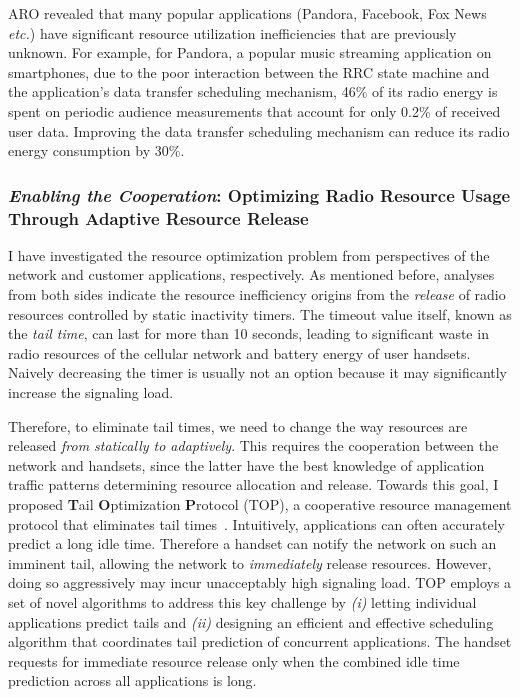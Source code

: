 \documentclass[10pt]{article}
\newcommand{\etc}{\emph{etc.}\xspace}
\begin{document}
\begin{small}
ARO revealed that many popular applications (Pandora, Facebook, Fox News \etc) have significant resource utilization inefficiencies that are previously unknown.
For example, for Pandora, a popular music streaming application on smartphones, due to the poor interaction between the RRC state machine and the application's data transfer scheduling mechanism, 46\% of its radio energy is spent on periodic audience measurements that account for only 0.2\% of received user data. Improving the data transfer scheduling mechanism can reduce its radio energy consumption by 30\%.


\subsubsection*{\emph{Enabling the Cooperation}: Optimizing Radio Resource Usage Through Adaptive Resource Release}

I have investigated the resource optimization problem from perspectives of the network and customer applications, respectively. As mentioned before, analyses from both sides indicate the resource inefficiency origins from the \emph{release} of radio resources controlled by static inactivity timers. The timeout value itself, known as the \emph{tail time}, can last for more than 10 seconds, leading to significant waste in radio resources of the cellular network and battery energy of user handsets. Naively decreasing the timer is usually not an option because it may significantly increase the signaling load.

Therefore, to eliminate tail times, we need to change the way resources are released \emph{from statically to adaptively}. This requires the cooperation between the network and handsets, since the latter have the best knowledge of application traffic patterns determining resource allocation and release. Towards this goal, I proposed \textbf{T}ail \textbf{O}ptimization \textbf{P}rotocol (TOP), a cooperative resource management protocol that eliminates tail times~\cite{qian10_icnp}. Intuitively, applications can often accurately predict a long idle time. Therefore a handset can notify the network on such an imminent tail, allowing the network to \emph{immediately} release resources. However, doing so aggressively may incur unacceptably high signaling load. TOP employs a set of novel algorithms to address this key challenge by \emph{(i)} letting individual applications predict tails and \emph{(ii)} designing an efficient and effective scheduling algorithm that coordinates tail prediction of concurrent applications. The handset requests for immediate resource release only when the combined idle time prediction across all applications is long.


\end{small}
\end{document}
